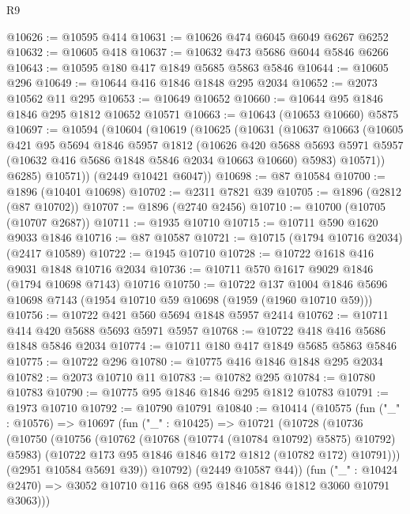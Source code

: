 \begin{lexlean}{R9}
\begin{coremodule}
@10626 := @10595 @414
@10631 := @10626 @474 @6045 @6049 @6267 @6252
@10632 := @10605 @418
@10637 := @10632 @473 @5686 @6044 @5846 @6266
@10643 := @10595 @180 @417 @1849 @5685 @5863 @5846
@10644 := @10605 @296
@10649 := @10644 @416 @1846 @1848 @295 @2034
@10652 := @2073 @10562 @11 @295
@10653 := @10649 @10652
@10660 := @10644 @95 @1846 @1846 @295 @1812 @10652 @10571
@10663 := @10643 (@10653 @10660) @5875
@10697 := @10594
    (@10604
      (@10619
        (@10625
          (@10631
            (@10637
              @10663
              (@10605
                @421
                @95
                @5694
                @1846
                @5957
                @1812
                (@10626
                  @420
                  @5688
                  @5693
                  @5971
                  @5957
                  (@10632 @416 @5686 @1848 @5846 @2034 @10663 @10660)
                  @5983)
                @10571))
            @6285)
          @10571))
      (@2449 @10421 @6047))
@10698 := @87 @10584
@10700 := @1896 (@10401 @10698)
@10702 := @2311 @7821 @39
@10705 := @1896 (@2812 (@87 @10702))
@10707 := @1896 (@2740 @2456)
@10710 := @10700 (@10705 (@10707 @2687))
@10711 := @1935 @10710
@10715 := @10711 @590 @1620 @9033 @1846
@10716 := @87 @10587
@10721 := @10715 (@1794 @10716 @2034) (@2417 @10589)
@10722 := @1945 @10710
@10728 := @10722 @1618 @416 @9031 @1848 @10716 @2034
@10736 := @10711 @570 @1617 @9029 @1846 (@1794 @10698 @7143) @10716
@10750 := @10722
    @137
    @1004
    @1846
    @5696
    @10698
    @7143
    (@1954 @10710 @59 @10698 (@1959 (@1960 @10710 @59)))
@10756 := @10722 @421 @560 @5694 @1848 @5957 @2414
@10762 := @10711 @414 @420 @5688 @5693 @5971 @5957
@10768 := @10722 @418 @416 @5686 @1848 @5846 @2034
@10774 := @10711 @180 @417 @1849 @5685 @5863 @5846
@10775 := @10722 @296
@10780 := @10775 @416 @1846 @1848 @295 @2034
@10782 := @2073 @10710 @11
@10783 := @10782 @295
@10784 := @10780 @10783
@10790 := @10775 @95 @1846 @1846 @295 @1812 @10783
@10791 := @1973 @10710
@10792 := @10790 @10791
@10840 := @10414
    (@10575
      (fun ("_" : @10576) =>
      @10697
        (fun ("_" : @10425) =>
        @10721
          (@10728
            (@10736
              (@10750
                (@10756
                  (@10762 (@10768 (@10774 (@10784 @10792) @5875) @10792) @5983)
                  (@10722 @173 @95 @1846 @1846 @172 @1812 (@10782 @172) @10791)))
              (@2951 @10584 @5691 @39))
            @10792)
          (@2449 @10587 @44))
        (fun ("_" : @10424 @2470) =>
        @3052 @10710 @116 @68 @95 @1846 @1846 @1812 @3060 @10791 @3063)))

\end{coremodule}
\end{lexlean}
